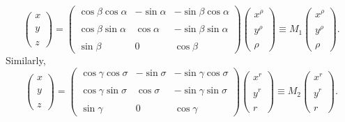 \documentclass[12pt]{report}
\begin{document}
\begin{equation}
  \label{eq:21}
  \left(\begin{matrix} x\\ \\ y\\ \\ z\end{matrix}\right) = 
  \left(\begin{matrix}\cos\beta\cos\alpha & -\sin\alpha &
      -\sin\beta\cos\alpha \\ \\
  \cos\beta\sin\alpha & \cos\alpha & -\sin\beta\sin\alpha \\ \\
  \sin\beta & 0 & \cos\beta\end{matrix}\right) 
  \left(\begin{matrix}x^\rho \\ \\ y^\rho \\ \\
      \rho\end{matrix}\right) \equiv M_1  \left(\begin{matrix}x^\rho
      \\ \\ y^\rho \\ \\ \rho\end{matrix}\right) . 
\end{equation}
Similarly, 
\begin{equation}
\label{eq:31}
  \left(\begin{matrix} x\\ \\ y\\ \\ z\end{matrix}\right) = 
  \left(\begin{matrix}\cos\gamma\cos\sigma & -\sin\sigma &
      -\sin\gamma\cos\sigma \\ \\
  \cos\gamma\sin\sigma & \cos\sigma & -\sin\gamma\sin\sigma \\ \\
  \sin\gamma & 0 & \cos\gamma\end{matrix}\right) 
  \left(\begin{matrix}x^r \\ \\ y^r \\ \\ r\end{matrix}\right) \equiv
  M_2 \left(\begin{matrix}x^r \\ \\ y^r \\ \\ r\end{matrix}\right).
\end{equation}
\end{document}
